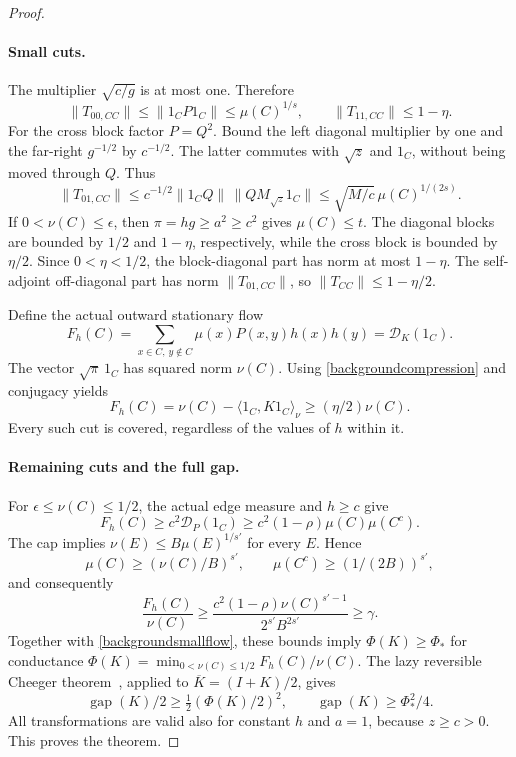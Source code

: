 \documentclass[11pt]{article}
\begin{document}
\begin{proof}
\paragraph{Small cuts.}
The multiplier $\sqrt{c/g}$ is at most one. Therefore
\[
 \|T_{00,CC}\|\leq\|1_CP1_C\|\leq\mu(C)^{1/s},
 \qquad\|T_{11,CC}\|\leq1-\eta.
\]
For the cross block factor $P=Q^2$. Bound the left diagonal multiplier
by one and the far-right $g^{-1/2}$ by $c^{-1/2}$. The latter commutes
with $\sqrt z$ and $1_C$, without being moved through $Q$. Thus
\[
 \|T_{01,CC}\|
 \leq c^{-1/2}\|1_CQ\|\,\|QM_{\sqrt z}1_C\|
 \leq\sqrt{M/c}\,\mu(C)^{1/(2s)}.
\]
If $0<\nu(C)\leq\epsilon$, then $\pi=hg\geq a^2\geq c^2$ gives
$\mu(C)\leq t$. The diagonal blocks are bounded by $1/2$ and
$1-\eta$, respectively, while the cross block is bounded by $\eta/2$.
Since $0<\eta<1/2$, the block-diagonal part has norm at most $1-\eta$.
The self-adjoint off-diagonal part has norm $\|T_{01,CC}\|$, so
$\|T_{CC}\|\leq1-\eta/2$.

Define the actual outward stationary flow
\[
 F_h(C)=\sum_{x\in C,\,y\notin C}\mu(x)P(x,y)h(x)h(y)
       =\mathcal D_K(1_C).
\]
The vector $\sqrt\pi\,1_C$ has squared norm $\nu(C)$.
Using \eqref{backgroundcompression} and conjugacy yields
\begin{equation}\label{backgroundsmallflow}
 F_h(C)=\nu(C)-\langle1_C,K1_C\rangle_\nu
       \geq(\eta/2)\nu(C).
\end{equation}
Every such cut is covered, regardless of the values of $h$ within it.

\paragraph{Remaining cuts and the full gap.}
For $\epsilon\leq\nu(C)\leq1/2$, the actual edge measure and $h\geq c$
give
\[
 F_h(C)\geq c^2\mathcal D_P(1_C)
       \geq c^2(1-\rho)\mu(C)\mu(C^c).
\]
The cap implies $\nu(E)\leq B\mu(E)^{1/s'}$ for every $E$. Hence
\[
 \mu(C)\geq(\nu(C)/B)^{s'},\qquad
 \mu(C^c)\geq(1/(2B))^{s'},
\]
and consequently
\[
 \frac{F_h(C)}{\nu(C)}
 \geq\frac{c^2(1-\rho)\nu(C)^{s'-1}}{2^{s'}B^{2s'}}\geq\gamma.
\]
Together with \eqref{backgroundsmallflow}, these bounds imply
$\Phi(K)\geq\Phi_*$ for conductance
$\Phi(K)=\min_{0<\nu(C)\leq1/2}F_h(C)/\nu(C)$.
The lazy reversible Cheeger theorem~\cite{peres}, applied to
$\overline K=(I+K)/2$, gives
\[
 \operatorname{gap}(K)/2\geq\tfrac12(\Phi(K)/2)^2,
 \qquad\operatorname{gap}(K)\geq\Phi_*^2/4.
\]
All transformations are valid also for constant $h$ and $a=1$, because
$z\geq c>0$. This proves the theorem.
\end{proof}
\end{document}

